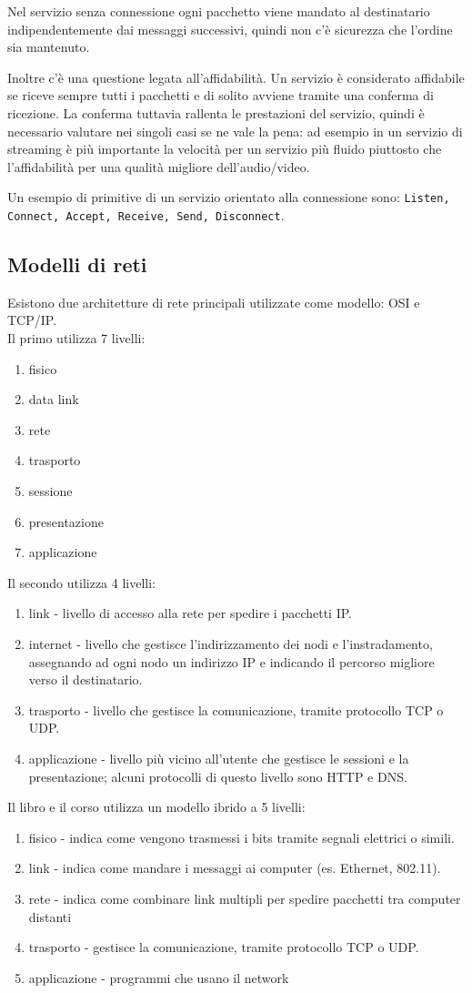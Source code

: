 Nel servizio senza connessione ogni pacchetto viene mandato al destinatario indipendentemente dai messaggi successivi, quindi non c'è sicurezza che l'ordine sia mantenuto. 

Inoltre c'è una questione legata all'affidabilità. 
Un servizio è considerato affidabile se riceve sempre tutti i pacchetti e di solito avviene tramite una conferma di ricezione. 
La conferma tuttavia rallenta le prestazioni del servizio, quindi è necessario valutare nei singoli casi se ne vale la pena: 
ad esempio in un servizio di streaming è più importante la velocità per un servizio più fluido piuttosto che l'affidabilità per una qualità migliore dell'audio/video.

Un esempio di primitive di un servizio orientato alla connessione sono: \texttt{Listen, Connect, Accept, Receive, Send, Disconnect}.

\subsection{Modelli di reti}
Esistono due architetture di rete principali utilizzate come modello: OSI e TCP/IP. \\
Il primo utilizza 7 livelli:
\begin{enumerate}
\item fisico
\item data link
\item rete
\item trasporto
\item sessione
\item presentazione
\item applicazione
\end{enumerate}
Il secondo utilizza 4 livelli:
\begin{enumerate}
\item link - livello  di accesso alla rete per spedire i pacchetti IP.
\item internet - livello che gestisce l'indirizzamento dei nodi e l'instradamento, assegnando ad ogni nodo un indirizzo IP e indicando il percorso migliore verso il destinatario.
\item trasporto - livello che gestisce la comunicazione, tramite protocollo TCP o UDP.
\item applicazione - livello più vicino all'utente che gestisce le sessioni e la presentazione; alcuni protocolli di questo livello sono HTTP e DNS.
\end{enumerate}
Il libro e il corso utilizza un modello ibrido a 5 livelli:
\begin{enumerate}
\item fisico - indica come vengono trasmessi i bits tramite segnali elettrici o simili.
\item link - indica come mandare i messaggi ai computer (es. Ethernet, 802.11).
\item rete - indica come combinare link multipli per spedire pacchetti tra computer distanti
\item trasporto - gestisce la comunicazione, tramite protocollo TCP o UDP.
\item applicazione - programmi che usano il network
\end{enumerate}

